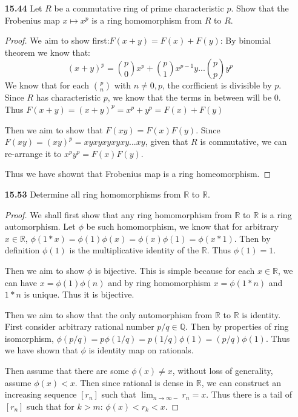 \documentclass[11pt, oneside]{article}
\newcommand{\Q}{\mathbb Q}
\newcommand{\R}{\mathbb R}
\begin{document}
\begin{enumerate}
\begin{proof}
For arbitrary $\dfrac{p}{q}\in \Q$, given that $g$ is surjective, there are some $a,b\in S$ such that $\dfrac{g(a)}{g(b)}=\dfrac{p}{q}$. Thus $f(ab^{-1})=\dfrac{p}{q}$ and f is sujective. 

Thus we have completed our proof and T is isomorphic to $\Q$.
\end{proof}

\newpage
\item[{\bf 15.44}] Let $R$ be a commutative ring of prime characteristic $p$. Show that the Frobenius map $x\mapsto x^p$ is a ring homomorphism from $R$ to $R$.
\begin{proof}
We aim to show first:$F(x+y)=F(x)+F(y)$: By binomial theorem we know that:
\[(x+y)^p=\binom{p}{0}x^p+\binom{p}{1}x^{p-1}y...\binom{p}{p}y^p \]
We know that for each $\binom{p}{n}$ with $n\neq 0, p$, the corfficient is divisible by $p$. Since $R$ has characteristic $p$, we know that the terms in between will be 0. Thus $F(x+y)=(x+y)^p=x^p+y^p=F(x)+F(y)$

Then we aim to show that $F(xy)=F(x)F(y)$. Since $F(xy)=(xy)^p=xyxyxyxyxy...xy$, given that $R$ is commutative, we can re-arrange it to $x^py^p=F(x)F(y)$. 

Thus we have shownt that Frobenius map is a ring homeomorphism. 

\end{proof}


\newpage
\item[{\bf 15.53}] Determine all ring homomorphisms from $\R$ to $\R$. 
\begin{proof}
We shall first show that any ring homomorphism from $\R$ to $\R$ is a ring automorphism. Let $\phi$ be such homomorphism, we know that for arbitrary $x\in \R$, $\phi(1*x)=\phi(1)\phi(x)=\phi(x)\phi(1)=\phi(x*1)$. Then by definition $\phi(1)$ is the multiplicative identity of the $\R$. Thus $\phi(1)=1$. 

Then we aim to show $\phi$ is bijective. This is simple because for each $x\in \R$, we can have $x=\phi(1)\phi(n)$ and by ring homomorphism $x=\phi(1*n)$ and $1*n$ is unique. Thus it is bijective. 

Then we aim to show that the only automorphism from $\R$ to $\R$ is identity. First consider arbitrary rational number $p/q\in \Q$. Then by properties of ring isomorphism, $\phi(p/q)=p\phi(1/q)=p(1/q)\phi(1)=(p/q)\phi(1)$. Thus we have shown that $\phi$ is identity map on rationals. 

Then assume that there are some $\phi(x)\neq x$, without loss of generality, assume $\phi(x)<x$. Then since rational is dense in $\R$, we can construct an increasing sequence $[r_n]$ such that $\lim_{n\rightarrow \infty -}r_n=x $. Thus there is a tail of $[r_n]$ such that for $k>m$: $\phi(x)<r_k<x$. 


\end{proof}
\end{enumerate}
\end{document}
